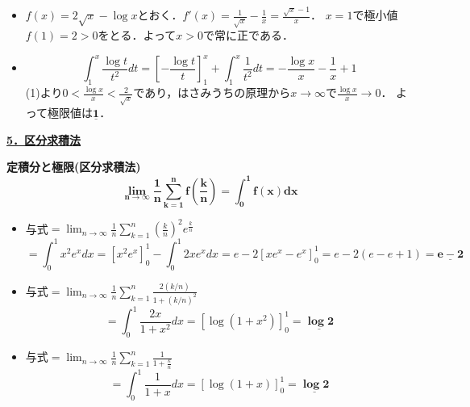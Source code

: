 \documentclass[a4paper,11pt]{ltjsarticle}
\begin{document}
\begin{ans}
\begin{itemize}
    \item [(1)]$f(x)=2\sqrt{x}-\log x$とおく．$f'(x)=\frac{1}{\sqrt{x}}-\frac{1}{x}=\frac{\sqrt{x}-1}{x}$．
    $x=1$で極小値$f(1)=2>0$をとる．よって$x>0$で常に正である．
    \item [(2)]
    \[\int_1^x \frac{\log t}{t^2}dt = \left[-\frac{\log t}{t}\right]_1^x + \int_1^x \frac{1}{t^2}dt = -\frac{\log x}{x} - \frac{1}{x} + 1\]
    (1)より$0<\frac{\log x}{x}<\frac{2}{\sqrt{x}}$であり，はさみうちの原理から$x\to\infty$で$\frac{\log x}{x}\to 0$．
    よって極限値は$\underline{\boldsymbol{1}}$．
\end{itemize}
\end{ans}
\newpage
\noindent \underline{{\large{\textbf{5．区分求積法}}}}
\begin{rembox}
    \textbf{定積分と極限(区分求積法)}
    \[\boldsymbol{\lim_{n\to\infty}\frac{1}{n}\sum_{k=1}^nf\left(\frac kn\right)=\int_0^1 f(x)dx}\]
\end{rembox}
\begin{ans}
\begin{itemize}
    \item [(1)]与式$=\lim_{n\to\infty}\frac{1}{n}\sum_{k=1}^n \left(\frac{k}{n}\right)^2 e^{\frac{k}{n}}$
    \[=\int_0^1 x^2e^x dx = [x^2e^x]_0^1 - \int_0^1 2xe^x dx = e - 2[xe^x-e^x]_0^1 = e - 2(e-e+1) = \underline{\boldsymbol{e-2}}\]
     \item [(2)]与式$=\lim_{n\to\infty}\frac{1}{n}\sum_{k=1}^n \frac{2(k/n)}{1+(k/n)^2}$
     \[=\int_0^1 \frac{2x}{1+x^2}dx = [\log(1+x^2)]_0^1 = \underline{\boldsymbol{\log 2}}\]
          \item [(3)]与式$=\lim_{n\to\infty}\frac{1}{n}\sum_{k=1}^n\frac{1}{1+\frac{k}{n}}$
          \[=\int_0^1 \frac{1}{1+x}dx = [\log(1+x)]_0^1 = \underline{\boldsymbol{\log 2}}\]
\end{itemize}
\end{ans}
\end{document}
